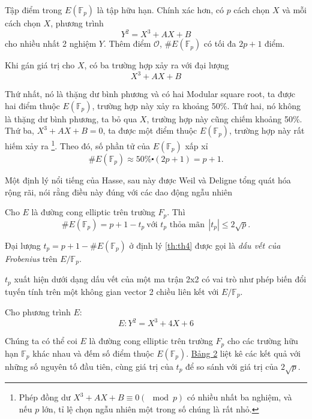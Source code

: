 Tập điểm trong $E(\mathbb{F}_{p})$ là tập hữu hạn. Chính xác hơn, có  $p$ cách chọn $X$ và mỗi cách chọn $X$, phương trình
$$Y^2 = X^3 + AX + B$$
cho nhiều nhất 2 nghiệm $Y$. Thêm điểm $\mathcal{O}$, $\#E(\mathbb{F}_{p})$ có tối đa $2p+1$ điểm.

Khi gán giá trị cho $X$, có ba trường hợp xảy ra với đại lượng
$$X^3 + AX + B$$

Thứ nhất, nó là thặng dư bình phương và có hai Modular square root, ta được hai điểm thuộc $E(\mathbb{F}_{p})$, trường hợp này xảy ra khoảng 50\%.
Thứ hai, nó không là thặng dư bình phương, ta bỏ qua $X$, trường hợp này cũng chiếm khoảng 50\%.
Thứ ba, $X^3 + AX + B = 0$, ta được một điểm thuộc $E(\mathbb{F}_{p})$, trường hợp này rất hiếm xảy ra \footnote{Phép đồng dư $X^3 + AX + B \equiv 0 (\mod p)$ có nhiều nhất ba nghiệm, và nếu $p$ lớn, tỉ lệ chọn ngẫu nhiên một trong số chúng là rất nhỏ.}.
Theo đó, số phần tử của $E(\mathbb{F}_{p})$ xấp xỉ
$$ \#E(\mathbb{F}_{p}) \approx 50\% \centerdot (2p + 1) = p + 1.$$

Một định lý nổi tiếng của Hasse, sau này được Weil và Deligne tổng quát hóa rộng rãi,
nói rằng điều này đúng với các dao động ngẫu nhiên

\begin{theorem}[Hasse]
	\label{th:th4}
	Cho $E$ là đường cong elliptic trên trường $F_{p}$. Thì
	$$ \#E(\mathbb{F}_{p}) = p + 1  -t_p \  \text{với $t_p$ thỏa mãn} \ \ |t_p| \leq 2\sqrt{p}.$$
\end{theorem}

\begin{definition}
	Đại lượng $t_p = p+1 - \#E(\mathbb{F}_p)$ ở định lý \ref{th:th4} được gọi là \textit{dấu vết của Frobenius} trên $E/\mathbb{F}_p$.
\end{definition}
$t_p$ xuất hiện dưới dạng dấu vết của một ma trận 2x2 có vai trò như phép biến đổi tuyến tính trên một không gian vector 2 chiều liên kết với  $E/\mathbb{F}_p$.

\begin{example}
	\label{ex:ex6}
	Cho phương trình $E$:
	$$E: Y^2 = X^3 + 4X + 6$$
\end{example}

Chúng ta có thể coi $E$ là đường cong elliptic trên trường $F_{p}$ cho các trường hữu hạn $\mathbb{F}_{p}$ khác nhau và đếm số điểm thuộc $E(\mathbb{F}_p).$
\hyperref[fg:tb2]{Bảng 2} liệt kê các kết quả với những số nguyên tố đầu tiên, cùng giá trị của $t_p$ để so sánh với giá trị của $2\sqrt{p}$.

